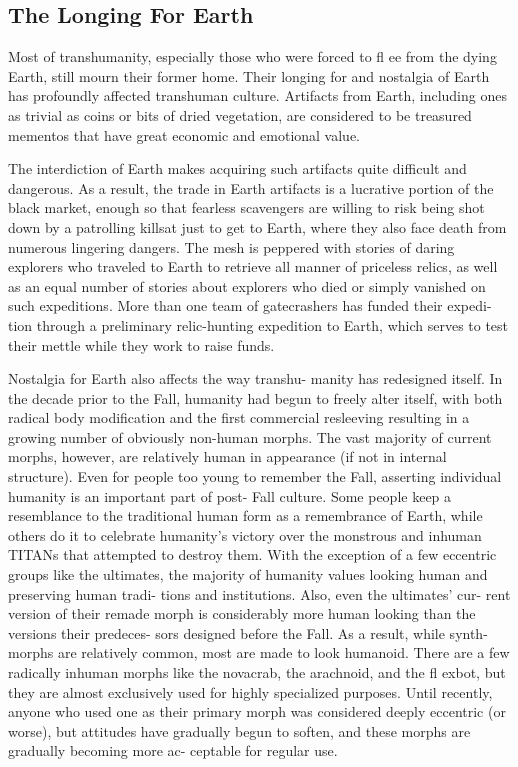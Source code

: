 \subsection{The Longing For Earth}

Most of transhumanity, especially those who were 
forced to fl ee from the dying Earth, still mourn their 
former home. Their longing for and nostalgia of 
Earth has profoundly affected transhuman culture. 
Artifacts from Earth, including ones as trivial as 
coins or bits of dried vegetation, are considered to 
be treasured mementos that have great economic and 
emotional value.

The interdiction of Earth makes acquiring such 
artifacts quite difficult and dangerous. As a result, the 
trade in Earth artifacts is a lucrative portion of the 
black market, enough so that fearless scavengers are 
willing to risk being shot down by a patrolling killsat 
just to get to Earth, where they also face death from 
numerous lingering dangers. The mesh is peppered 
with stories of daring explorers who traveled to Earth 
to retrieve all manner of priceless relics, as well as 
an equal number of stories about explorers who died 
or simply vanished on such expeditions. More than 
one team of gatecrashers has funded their expedi-
tion through a preliminary relic-hunting expedition 
to Earth, which serves to test their mettle while they 
work to raise funds.

Nostalgia for Earth also affects the way transhu-
manity has redesigned itself. In the decade prior to 
the Fall, humanity had begun to freely alter itself, 
with both radical body modification and the first 
commercial resleeving resulting in a growing number 
of obviously non-human morphs. The vast majority 
of current morphs, however, are relatively human 
in appearance (if not in internal structure). Even for 
people too young to remember the Fall, asserting 
individual humanity is an important part of post-
Fall culture. Some people keep a resemblance to the 
traditional human form as a remembrance of Earth, 
while others do it to celebrate humanity's victory over 
the monstrous and inhuman TITANs that attempted 
to destroy them. With the exception of a few eccentric 
groups like the ultimates, the majority of humanity 
values looking human and preserving human tradi-
tions and institutions. Also, even the ultimates' cur-
rent version of their remade morph is considerably 
more human looking than the versions their predeces-
sors designed before the Fall. As a result, while synth-
morphs are relatively common, most are made to look 
humanoid. There are a few radically inhuman morphs 
like the novacrab, the arachnoid, and the fl exbot, but 
they are almost exclusively used for highly specialized 
purposes. Until recently, anyone who used one as their 
primary morph was considered deeply eccentric (or 
worse), but attitudes have gradually begun to soften, 
and these morphs are gradually becoming more ac-
ceptable for regular use.

